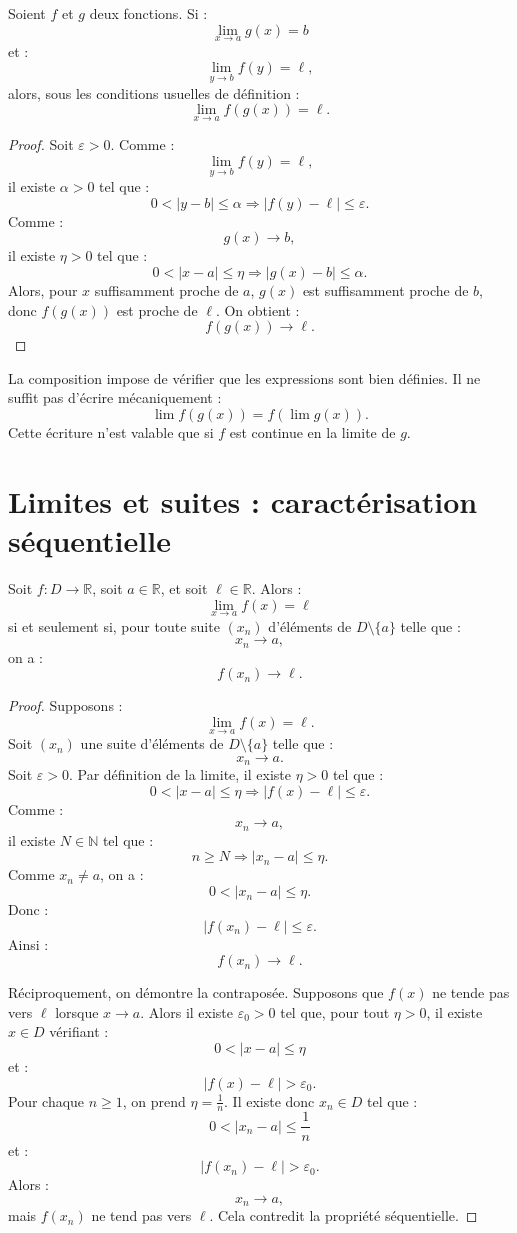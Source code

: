 \documentclass[11pt,a4paper]{article}
\newcommand{\N}{\mathbb N}
\newcommand{\R}{\mathbb R}
\newcommand{\implique}{\Longrightarrow}
\begin{document}
\begin{theorembox}
Soient \(f\) et \(g\) deux fonctions.  
Si :
\[
\lim_{x\to a}g(x)=b
\]
et :
\[
\lim_{y\to b}f(y)=\ell,
\]
alors, sous les conditions usuelles de définition :
\[
\lim_{x\to a}f(g(x))=\ell.
\]
\end{theorembox}

\begin{proof}
Soit \(\varepsilon>0\).  
Comme :
\[
\lim_{y\to b}f(y)=\ell,
\]
il existe \(\alpha>0\) tel que :
\[
0<|y-b|\leq\alpha \implique |f(y)-\ell|\leq\varepsilon.
\]
Comme :
\[
g(x)\to b,
\]
il existe \(\eta>0\) tel que :
\[
0<|x-a|\leq\eta \implique |g(x)-b|\leq\alpha.
\]
Alors, pour \(x\) suffisamment proche de \(a\), \(g(x)\) est suffisamment proche de \(b\), donc \(f(g(x))\) est proche de \(\ell\).  
On obtient :
\[
f(g(x))\to\ell.
\]
\end{proof}

\begin{erreurbox}
La composition impose de vérifier que les expressions sont bien définies.  
Il ne suffit pas d'écrire mécaniquement :
\[
\lim f(g(x))=f(\lim g(x)).
\]
Cette écriture n'est valable que si \(f\) est continue en la limite de \(g\).
\end{erreurbox}

\section{Limites et suites : caractérisation séquentielle}

\begin{theorembox}
Soit \(f:D\to\R\), soit \(a\in\R\), et soit \(\ell\in\R\).  
Alors :
\[
\lim_{x\to a}f(x)=\ell
\]
si et seulement si, pour toute suite \((x_n)\) d'éléments de \(D\setminus\{a\}\) telle que :
\[
x_n\to a,
\]
on a :
\[
f(x_n)\to\ell.
\]
\end{theorembox}

\begin{proof}
Supposons :
\[
\lim_{x\to a}f(x)=\ell.
\]
Soit \((x_n)\) une suite d'éléments de \(D\setminus\{a\}\) telle que :
\[
x_n\to a.
\]
Soit \(\varepsilon>0\).  
Par définition de la limite, il existe \(\eta>0\) tel que :
\[
0<|x-a|\leq\eta \implique |f(x)-\ell|\leq\varepsilon.
\]
Comme :
\[
x_n\to a,
\]
il existe \(N\in\N\) tel que :
\[
n\geq N\implique |x_n-a|\leq\eta.
\]
Comme \(x_n\neq a\), on a :
\[
0<|x_n-a|\leq\eta.
\]
Donc :
\[
|f(x_n)-\ell|\leq\varepsilon.
\]
Ainsi :
\[
f(x_n)\to\ell.
\]

Réciproquement, on démontre la contraposée.  
Supposons que \(f(x)\) ne tende pas vers \(\ell\) lorsque \(x\to a\).  
Alors il existe \(\varepsilon_0>0\) tel que, pour tout \(\eta>0\), il existe \(x\in D\) vérifiant :
\[
0<|x-a|\leq\eta
\]
et :
\[
|f(x)-\ell|>\varepsilon_0.
\]
Pour chaque \(n\geq1\), on prend \(\eta=\frac1n\).  
Il existe donc \(x_n\in D\) tel que :
\[
0<|x_n-a|\leq\frac1n
\]
et :
\[
|f(x_n)-\ell|>\varepsilon_0.
\]
Alors :
\[
x_n\to a,
\]
mais \(f(x_n)\) ne tend pas vers \(\ell\).  
Cela contredit la propriété séquentielle.
\end{proof}
\end{document}
